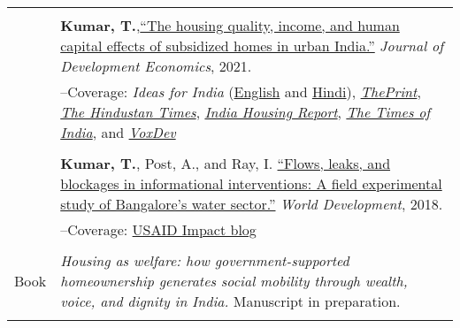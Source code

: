 \documentclass[letterpaper, 11pt]{article}
\begin{document}
\begin{longtable}{p{1in}p{5.5in}}
& \\

&\textbf{Kumar, T.},\href{https://doi.org/10.1016/j.jdeveco.2021.102738}{``The housing quality, income, and human capital effects of subsidized homes in urban India.''} \textit{Journal of Development Economics}, 2021.\\

&--\indent Coverage: \textit{Ideas for India} (\href{https://www.ideasforindia.in/topics/poverty-inequality/household-level-effects-of-affordable-housing-evidence-from-mumbai.html}{English} and \href{https://www.ideasforindia.in/topics/poverty-inequality/household-level-effects-of-affordable-housing-evidence-from-mumbai-hindi.html}{Hindi}), \href{https://theprint.in/opinion/mumbai-residents-win-govt-housing-lottery-and-spend-more-on-kids-education-jobs-study/290485/}{\textit{ThePrint}}, \href{https://www.hindustantimes.com/opinion/housing-is-a-welfare-weapon-it-can-help-people-escape-poverty-101629993983576.html}{\textit{The Hindustan Times}}, \href{https://indiahousingreport.in/outputs/opinion/housing-is-a-welfare-weapon-it-can-help-people-escape-poverty/}{\textit{India Housing Report}}, \href{https://timesofindia.indiatimes.com/city/mumbai/mhada-home-winners-see-upswing-in-family-edu-pay-in-mumbai-study/articleshow/86468320.cms}{\textit{The Times of India}}, and \href{https://voxdev.org/topic/infrastructure-urbanisation/household-level-effects-subsidised-housing-evidence-urban-india?utm_source=dlvr.it&utm_medium=twitter}{\textit{VoxDev}} \\
& \\

&\textbf{Kumar, T.}, Post, A., and Ray, I. \href{https://www.sciencedirect.com/science/article/pii/S0305750X1830032}{``Flows, leaks, and blockages in informational interventions: A field experimental study of Bangalore's water sector.''} \textit{World Development}, 2018.\\

&--\indent Coverage: \href{https://blog.usaid.gov/2016/05/using-mobile-phones-to-alert-households-waiting-for-nextdrop-of-water/}{USAID Impact blog} \\
& \\

{{Book}} 
& \textit{Housing as welfare: how government-supported homeownership generates social mobility through wealth, voice, and dignity in India.} Manuscript in preparation. \\
& \\



\end{longtable}
\end{document}
